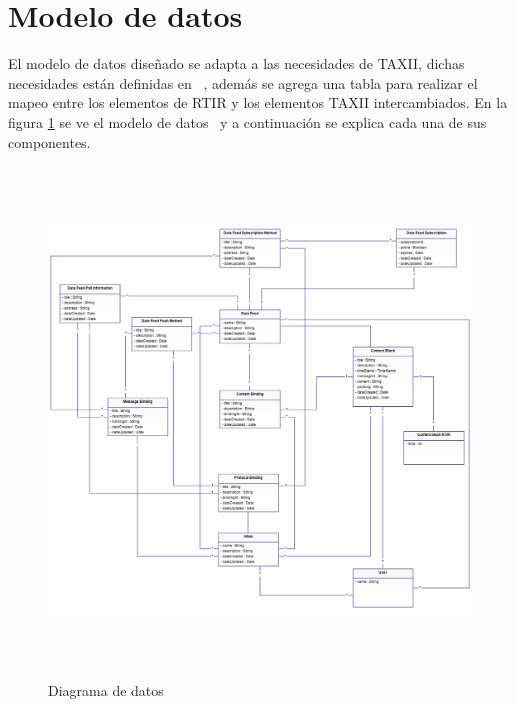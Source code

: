 	
	\bigskip
	
	\section{Modelo de datos}
	El modelo de datos diseñado se adapta a las necesidades de TAXII, dichas necesidades están
		definidas en \ \cite{M15}, además se agrega una tabla para realizar el mapeo entre los elementos de RTIR y los elementos
		TAXII intercambiados. En la figura \ref{fig.diagramadedatos} se ve el modelo de datos \ y a continuación se explica cada una de sus
		componentes.
	
	\begin{figure}[ht!]
	\centering
	\includegraphics[width=5.7638in,height=5.3126in]{Diseno21-img/Diseno21-img004.png} 
	\caption{Diagrama de datos}
	\label{fig.diagramadedatos}
	\end{figure}
	\bigskip
	

